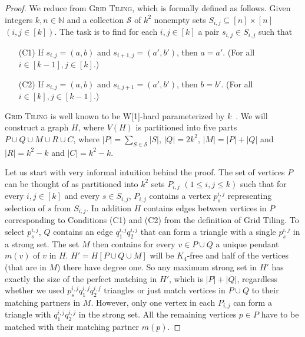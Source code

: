 \begin{proof}
We reduce from \textsc{Grid Tiling}, which is formally defined as follows. Given integers $k,n\in \mathbb{N}$ and a collection $\mathcal{S}$ of $k^2$ nonempty sets $S_{i,j}\subseteq [n]\times [n]$ $ (i,j\in [k])$. The task is to find for each $i,j\in [k]$ a pair $s_{i,j}\in S_{i,j}$ such that 
\begin{itemize}
\item[(C1)] If $s_{i,j} = (a,b)$ and $s_{i+1,j} = (a',b')$, then $a=a'$. (For all $i\in [k-1], j\in [k]$.)
\item[(C2)] If $s_{i,j} = (a,b)$ and $s_{i,j+1} = (a',b')$, then $b=b'$. (For all $i\in [k], j\in [k-1]$.)
\end{itemize} 
\textsc{Grid Tiling} is well known to be W[1]-hard parameterized by $k$~\cite{CyganFKLMPPS15PCbook}. We will construct a graph $H$, where $V(H)$ is partitioned into five parts $P \cup Q \cup M \cup R\cup C$, where $|P|=\sum_{S\in \mathcal{S}}|S|$, $|Q|= 2k^2$, $|M| = |P|+|Q|$ and $|R|= k^2-k$ and $|C|= k^2-k$.  

Let us start with very informal intuition behind the proof. 
The set of vertices $P$ can be thought of as partitioned into $k^2$ sets $P_{i,j}$ $(1\le i,j\le k)$ such that for every $i,j\in [k]$ and every $s\in S_{i,j}$, $P_{i,j}$ contains a vertex $p_s^{i,j}$ representing selection of $s$ from $S_{i,j}$. In addition $H$ contains edges between vertices in $P$ corresponding to Conditions (C1) and (C2) from the definition of Grid Tiling. 
To select $p_s^{i,j}$, $Q$ contains an edge $q^{i,j}_1q^{i,j}_2$ that can form a triangle with a single $p_s^{i,j}$ in a strong set. The set $M$ then contains for every $v\in P\cup Q$ a unique pendant $m(v)$ of $v$ in $H$. $H' = H[P\cup Q \cup M]$ will be $K_4$-free and half of the vertices (that are in $M$) there have degree one. So any maximum strong set in $H'$ has exactly the size of the perfect matching in $H'$, which is $|P|+|Q|$, regardless whether we used $p_s^{i,j}q^{i,j}_1q^{i,j}_2$ triangles or just match vertices in $P\cup Q$ to their matching partners in $M$. However, only one vertex in each $P_{i,j}$ can form a triangle with $q^{i,j}_1q^{i,j}_2$ in the strong set. All the remaining vertices $p\in P$ have to be matched with their matching partner $m(p)$.


\end{proof}
